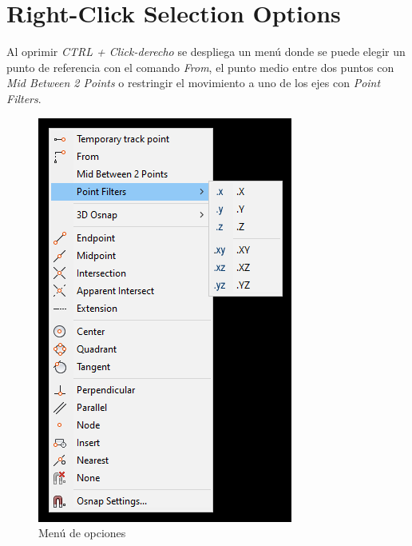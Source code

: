 \documentclass{report}
\begin{document}
\chapter{Right-Click Selection Options}

Al oprimir \emph{CTRL + Click-derecho} se despliega un menú donde se puede elegir un punto de referencia con el comando \emph{From}, el punto medio entre dos puntos con \emph{Mid Between 2 Points} o restringir el movimiento a uno de los ejes con \emph{Point Filters}.

\begin{figure}[H]
	\centering
	\includegraphics[width=0.85\linewidth, height=0.45\textheight,keepaspectratio]{Imagenes/autocad_rightclickmenu01}
	\caption{Menú de opciones}
	\label{fig:autocadrightclickmenu01}
\end{figure}
\end{document}
